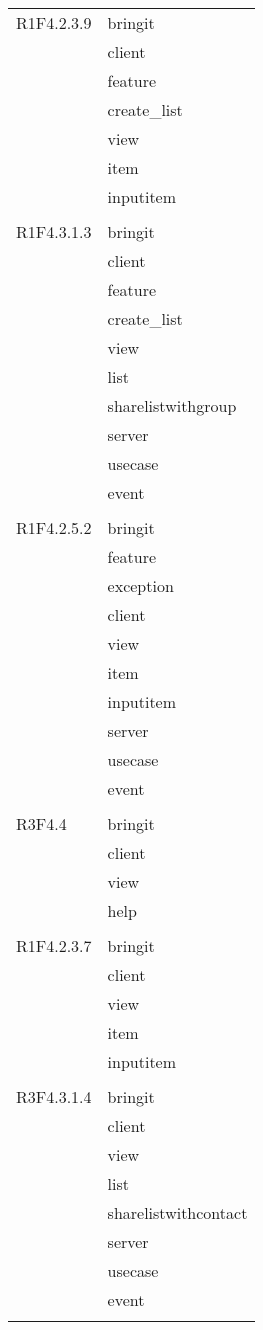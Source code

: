\begin{center}
\begin{longtable}{|p{7cm}|p{7cm}|}
		R1F4.2.3.9 & bringit \\ & client \\ & feature \\ & create\_list \\ & view \\ & item \\ & inputitem \\ & \\ \hline
		R1F4.3.1.3 & bringit \\ & client \\ & feature \\ & create\_list \\ & view \\ & list \\ & sharelistwithgroup \\ & server \\ & usecase \\ & event \\ & \\ \hline
		R1F4.2.5.2 & bringit \\ & feature \\ & exception \\ & client \\ & view \\ & item \\ & inputitem \\ & server \\ & usecase \\ & event \\ & \\ \hline
		R3F4.4 & bringit \\ & client \\ & view \\ & help \\ & \\ \hline
		R1F4.2.3.7 & bringit \\ & client \\ & view \\ & item \\ & inputitem \\ & \\ \hline
		R3F4.3.1.4 & bringit \\ & client \\ & view \\ & list \\ & sharelistwithcontact \\ & server \\ & usecase \\ & event \\ & \\ \hline

\end{longtable}
\end{center}
